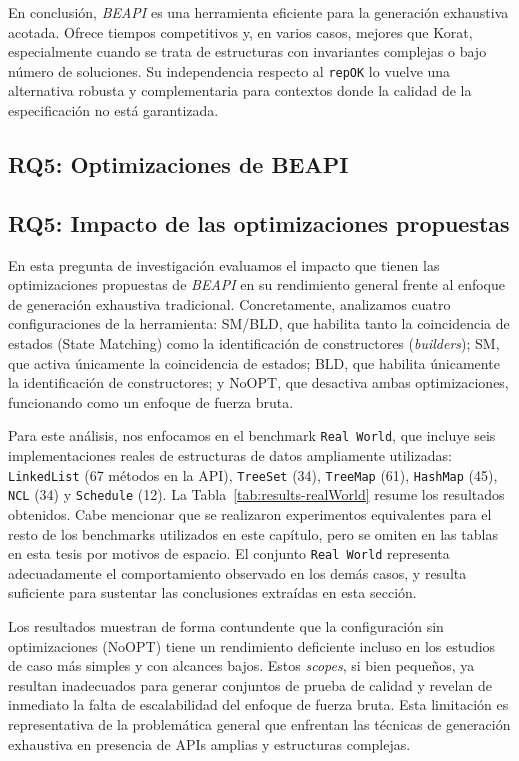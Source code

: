 En conclusión, \emph{BEAPI} es una herramienta eficiente para la generación exhaustiva acotada. 
Ofrece tiempos competitivos y, en varios casos, mejores que \textsf{Korat}, especialmente cuando 
se trata de estructuras con invariantes complejas o bajo número de soluciones. Su independencia 
respecto al \texttt{repOK} lo vuelve una alternativa robusta y complementaria para contextos donde 
la calidad de la especificación no está garantizada.


\subsection{RQ5: Optimizaciones de BEAPI}
\label{sec:optimizations}
\subsection{RQ5: Impacto de las optimizaciones propuestas}

En esta pregunta de investigación evaluamos el impacto que tienen las optimizaciones propuestas 
de \emph{BEAPI} en su rendimiento general frente al enfoque de generación exhaustiva tradicional. 
Concretamente, analizamos cuatro configuraciones de la herramienta: \textsf{SM/BLD}, que habilita tanto 
la coincidencia de estados (State Matching) como la identificación de constructores (\emph{builders}); 
\textsf{SM}, que activa únicamente la coincidencia de estados; \textsf{BLD}, que habilita únicamente 
la identificación de constructores; y \textsf{NoOPT}, que desactiva ambas optimizaciones, funcionando 
como un enfoque de fuerza bruta.

Para este análisis, nos enfocamos en el benchmark \texttt{Real World}, que incluye seis 
implementaciones reales de estructuras de datos ampliamente utilizadas: \texttt{LinkedList} 
(67 métodos en la API), \texttt{TreeSet} (34), \texttt{TreeMap} (61), \texttt{HashMap} (45), \texttt{NCL} (34) y 
\texttt{Schedule} (12). La Tabla~\ref{tab:results-realWorld} 
resume los resultados obtenidos. Cabe mencionar que se realizaron experimentos equivalentes para 
el resto de los benchmarks utilizados en este capítulo, pero se omiten en las tablas en esta tesis por motivos de espacio.
El conjunto \texttt{Real World} representa adecuadamente el comportamiento observado en los demás casos, 
y resulta suficiente para sustentar las conclusiones extraídas en esta sección.

Los resultados muestran de forma contundente que la configuración sin optimizaciones (\textsf{NoOPT}) 
tiene un rendimiento deficiente incluso en los estudios de caso más simples y con alcances bajos. 
Estos \emph{scopes}, si bien pequeños, ya resultan inadecuados para generar conjuntos de prueba de 
calidad y revelan de inmediato la falta de escalabilidad del enfoque de fuerza bruta. Esta limitación 
es representativa de la problemática general que enfrentan las técnicas de generación exhaustiva en 
presencia de APIs amplias y estructuras complejas.

